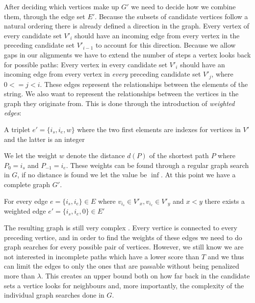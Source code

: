 \documentclass[thesis.tex]{subfiles}
\begin{document}
\par\noindent
After deciding which vertices make up $G'$ we need to decide how we combine them, through the edge set $E'$. Because the subsets of candidate vertices follow a natural ordering there is already defined a direction in the graph. Every vertex of every candidate set $V'_i$ should have an incoming edge from every vertex in the preceding candidate set $V'_{i-1}$ to account for this direction. Because we allow gaps in our alignments we have to extend the number of steps a vertex looks back for possible paths: Every vertex in every candidate set $V'_i$ should have an incoming edge from every vertex in \textit{every} preceding candidate set $V'_{j}$, where $0<=j<i$. These edges represent the relationships between the elements of the string. We also want to represent the relationships between the vertices in the graph they originate from. This is done through the introduction of \textit{weighted edges}:
\begin{defn}
  A triplet $e'=\{i_s, i_e, w\}$ where the two first elements are indexes for vertices in $V'$ and the latter is an integer
\end{defn}
\noindent
We let the weight $w$ denote the distance $d(P)$ of the shortest path $P$ where $P_0=i_s$ and $P_{-1}=i_e$. These weights can be found through a regular graph search in $G$, if no distance is found we let the value be $\inf$. At this point we have a complete graph $G'$.
\begin{corollary}
  For every edge $e=\{i_s, i_e\} \in E$ where $v_{i_s} \in V'_x, v_{i_e} \in V'_y$ and $x<y$ there exists a weighted edge $e'=\{i_s, i_e, 0\} \in E'$
\end{corollary}
\noindent
The resulting graph is still very complex . Every vertice is connected to every preceding vertice, and in order to find the weights of these edges we need to do graph searches for every possible pair of vertices. However, we still know we are not interested in incomplete paths which have a lower score than $T$ and we thus can limit the edges to only the ones that are passable without being penalized more than $\lambda$. This creates an upper bound both on how far back in the candidate sets a vertice looks for neighbours and, more importantly, the complexity of the individual graph searches done in $G$.
\end{document}
